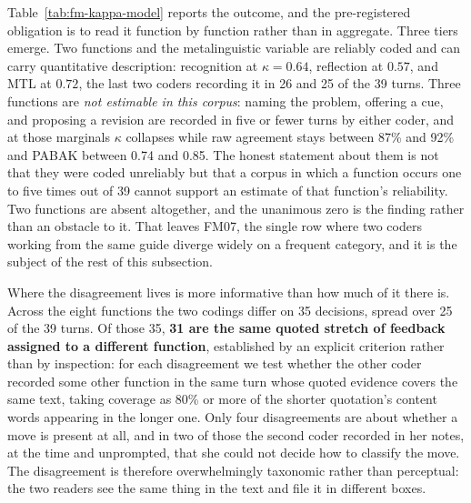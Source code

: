 \documentclass{sbc2023}%
\begin{document}
Table~\ref{tab:fm-kappa-model} reports the outcome, and the pre-registered obligation is to read it function by function rather than in aggregate. Three tiers emerge. Two functions and the metalinguistic variable are reliably coded and can carry quantitative description: recognition at $\kappa = 0.64$, reflection at $0.57$, and MTL at $0.72$, the last two coders recording it in 26 and 25 of the 39 turns. Three functions are \textit{not estimable in this corpus}: naming the problem, offering a cue, and proposing a revision are recorded in five or fewer turns by either coder, and at those marginals $\kappa$ collapses while raw agreement stays between 87\% and 92\% and PABAK between 0.74 and 0.85. The honest statement about them is not that they were coded unreliably but that a corpus in which a function occurs one to five times out of 39 cannot support an estimate of that function's reliability. Two functions are absent altogether, and the unanimous zero is the finding rather than an obstacle to it. That leaves FM07, the single row where two coders working from the same guide diverge widely on a frequent category, and it is the subject of the rest of this subsection.

Where the disagreement lives is more informative than how much of it there is. Across the eight functions the two codings differ on 35 decisions, spread over 25 of the 39 turns. Of those 35, \textbf{31 are the same quoted stretch of feedback assigned to a different function}, established by an explicit criterion rather than by inspection: for each disagreement we test whether the other coder recorded some other function in the same turn whose quoted evidence covers the same text, taking coverage as 80\% or more of the shorter quotation's content words appearing in the longer one. Only four disagreements are about whether a move is present at all, and in two of those the second coder recorded in her notes, at the time and unprompted, that she could not decide how to classify the move. The disagreement is therefore overwhelmingly taxonomic rather than perceptual: the two readers see the same thing in the text and file it in different boxes.
\end{document}
